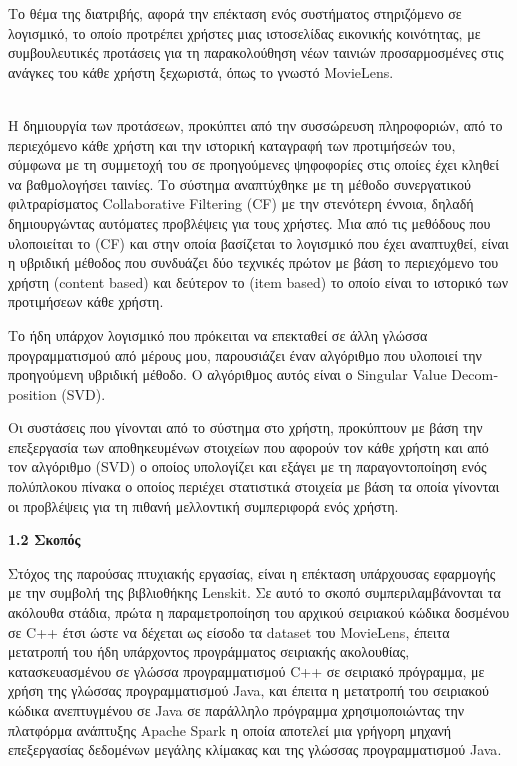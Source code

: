 \documentclass{report}
\begin{document}
Το θέμα της διατριβής, αφορά την επέκταση ενός συστήματος στηριζόμενο σε λογισμικό, το οποίο προτρέπει χρήστες μιας ιστοσελίδας  εικονικής κοινότητας, με συμβουλευτικές προτάσεις για τη παρακολούθηση νέων ταινιών προσαρμοσμένες στις ανάγκες του κάθε χρήστη ξεχωριστά, όπως το γνωστό \textlatin{MovieLens}.
\vspace{1mm}

\\
Η δημιουργία των προτάσεων, προκύπτει από την συσσώρευση πληροφοριών, από το περιεχόμενο κάθε χρήστη και την ιστορική καταγραφή των προτιμήσεών του, σύμφωνα με τη συμμετοχή του σε προηγούμενες ψηφοφορίες στις οποίες έχει κληθεί να βαθμολογήσει ταινίες. Το σύστημα αναπτύχθηκε με τη μέθοδο συνεργατικού φιλτραρίσματος \textlatin{Collaborative Filtering (CF)} με την στενότερη έννοια, δηλαδή δημιουργώντας αυτόματες προβλέψεις για τους χρήστες. Μια από τις μεθόδους που υλοποιείται το \textlatin{(CF)} και στην οποία βασίζεται το λογισμικό που έχει αναπτυχθεί, είναι η υβριδική μέθοδος που συνδυάζει δύο τεχνικές πρώτον με βάση το περιεχόμενο του χρήστη \textlatin{(content based)} και δεύτερον το \textlatin{(item based)} το οποίο είναι το ιστορικό των προτιμήσεων κάθε χρήστη.

Το ήδη υπάρχον λογισμικό που πρόκειται να επεκταθεί σε άλλη γλώσσα προγραμματισμού από μέρους μου, παρουσιάζει έναν αλγόριθμο που υλοποιεί την προηγούμενη υβριδική μέθοδο. Ο
αλγόριθμος αυτός είναι ο \textlatin{Singular Value Decomposition (SVD)}.

Οι συστάσεις που γίνονται από το σύστημα στο χρήστη, προκύπτουν με βάση την επεξεργασία των αποθηκευμένων στοιχείων που αφορούν τον κάθε χρήστη και από τον αλγόριθμο \textlatin{(SVD)} ο οποίος υπολογίζει και εξάγει με τη παραγοντοποίηση ενός πολύπλοκου πίνακα ο οποίος περιέχει στατιστικά στοιχεία με βάση τα οποία γίνονται οι προβλέψεις για τη πιθανή μελλοντική συμπεριφορά ενός χρήστη. 

\vspace{20mm} 


\textbf{\large{1.2 Σκοπός}}

\vspace{2mm}

Στόχος της παρούσας πτυχιακής εργασίας, είναι η επέκταση υπάρχουσας εφαρμογής με την συμβολή της βιβλιοθήκης \textlatin{Lenskit}. Σε αυτό το σκοπό συμπεριλαμβάνονται τα ακόλουθα στάδια, πρώτα η παραμετροποίηση του αρχικού σειριακού κώδικα δοσμένου σε \textlatin{C++} έτσι ώστε να δέχεται ως είσοδο τα \textlatin{dataset} του \textlatin{MovieLens}, έπειτα μετατροπή του ήδη υπάρχοντος προγράμματος σειριακής ακολουθίας, κατασκευασμένου σε γλώσσα προγραμματισμού \textlatin{C}++ σε σειριακό πρόγραμμα, με χρήση της γλώσσας προγραμματισμού \textlatin{Java}, και έπειτα η μετατροπή του σειριακού κώδικα ανεπτυγμένου σε \textlatin{Java} σε παράλληλο πρόγραμμα χρησιμοποιώντας την πλατφόρμα ανάπτυξης
\textlatin{Apache Spark} η οποία αποτελεί μια γρήγορη μηχανή επεξεργασίας δεδομένων μεγάλης κλίμακας και της γλώσσας προγραμματισμού \textlatin{Java}.
\vspace{1mm}
\end{document}
